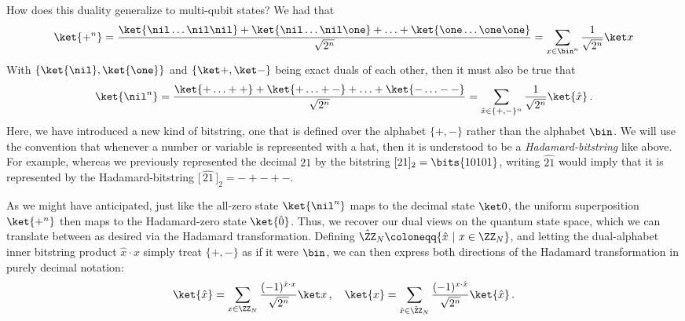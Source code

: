       How does this duality generalize to multi-qubit states?
        We had that
        \[
          \ket{+^n} 
          = \frac{\ket{\nil \ldots \nil\nil} + \ket{\nil \ldots \nil\one} + \ldots + \ket{\one \ldots \one\one}}{\sqrt{2^n}}
          = \sum_{x \in \bin^n} \frac{1}{\sqrt{2^n}}\ket x
        \]
        With $\{\ket{\nil}, \ket{\one}\}$ and $\{\ket +, \ket -\}$ being exact duals of
        each other, then it must also be true that 
        \[
          \ket{\nil^n} 
          = \frac{\ket{+ \ldots ++} + \ket{+ \ldots +-} + \ldots + \ket{- \ldots --}}{\sqrt{2^n}}
          = \sum_{\hat{x} \in \{+,-\}^n} \frac{1}{\sqrt{2^n}} \ket{\hat x}\, .
        \]
        Here, we have introduced a new kind of bitstring, one that is defined
        over the alphabet $\{+, -\}$ rather than the alphabet $\bin$. We will use the
        convention that whenever a number or variable is represented with a hat,
        then it is understood to be a \emph{Hadamard-bitstring} like above. For example,
        whereas we previously represented the decimal $21$ by the bitstring
        $[21]_2 = \bits{10101}$, writing $\widehat{21}$ would imply that it is
        represented by the Hadamard-bitstring $\big[\, \widehat{21}\, \big]_2 = -+-+-$. 

      As we might have anticipated, just like the all-zero state $\ket{\nil^n}$
        maps to the decimal state $\ket 0$, 
        the uniform superposition $\ket{+^n}$
        then maps to the Hadamard-zero state $\ket{\hat 0}$.
        Thus, we recover our dual views on the quantum
        state space, which we can translate between as desired via the Hadamard
        transformation. Defining $\hat{\ZZ}_N \coloneqq \{ \hat{x}\ |\ x \in
        \ZZ_N\}$, and letting the dual-alphabet inner bitstring product
        $\hat x \cdot x$ simply treat $\{+,-\}$ as if it were $\bin$,
        we can then express both directions of the Hadamard transformation in
        purely decimal notation:
        \[
          \ket{\hat x} = \sum_{x \in \ZZ_N} 
          \frac{(-1)^{\hat x \cdot x}}{\sqrt{2^n}} \ket x\, ,
          \quad
          \ket{x} = \sum_{\hat x \in \hat{\ZZ}_N} \frac{(-1)^{x \cdot
          \hat x}}{\sqrt{2^n}} \ket{\hat{x}}\, .
        \]
        
